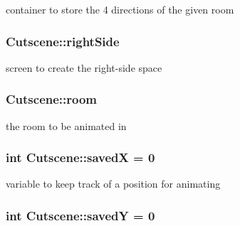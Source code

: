 container to store the 4 directions of the given room 

\hypertarget{classCutscene_ac8cc850025b847d951e74418b757d62c}{
\subsubsection[{right\-Side}]{ Cutscene\-::right\-Side\hspace{0.3cm}{\ttfamily [private]}}}\label{classCutscene_ac8cc850025b847d951e74418b757d62c}


screen to create the right-\/side space 

\hypertarget{classCutscene_a033c0715f32be9730d3692e57fe17096}{
\subsubsection[{room}]{ Cutscene\-::room\hspace{0.3cm}{\ttfamily [private]}}}\label{classCutscene_a033c0715f32be9730d3692e57fe17096}


the room to be animated in 

\hypertarget{classCutscene_a1d5c331a4d60a28f84eaa987f2a2fb4f}{
\subsubsection[{saved\-X}]{\setlength{\rightskip}{0pt plus 5cm}int Cutscene\-::saved\-X = 0\hspace{0.3cm}{\ttfamily [private]}}}\label{classCutscene_a1d5c331a4d60a28f84eaa987f2a2fb4f}


variable to keep track of a position for animating 

\hypertarget{classCutscene_af8166fd7fdf29fe8f86cadd29363fd78}{
\subsubsection[{saved\-Y}]{\setlength{\rightskip}{0pt plus 5cm}int Cutscene\-::saved\-Y = 0\hspace{0.3cm}{\ttfamily [private]}}}\label{classCutscene_af8166fd7fdf29fe8f86cadd29363fd78}


